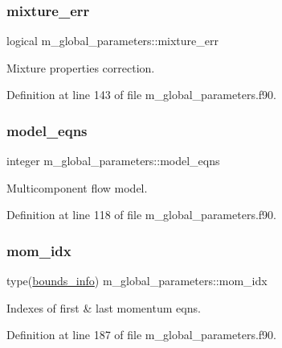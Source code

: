 \subsubsection{\texorpdfstring{mixture\+\_\+err}{mixture\_err}}
{\footnotesize\ttfamily logical m\+\_\+global\+\_\+parameters\+::mixture\+\_\+err}



Mixture properties correction. 



Definition at line 143 of file m\+\_\+global\+\_\+parameters.\+f90.

\mbox{\label{namespacem__global__parameters_a6cf2e92cfc3b519fb6da6fe9e88fab31}} 
\subsubsection{\texorpdfstring{model\+\_\+eqns}{model\_eqns}}
{\footnotesize\ttfamily integer m\+\_\+global\+\_\+parameters\+::model\+\_\+eqns}



Multicomponent flow model. 



Definition at line 118 of file m\+\_\+global\+\_\+parameters.\+f90.

\mbox{\label{namespacem__global__parameters_ad138d35528cf27ff42dba00d13c269be}} 
\subsubsection{\texorpdfstring{mom\+\_\+idx}{mom\_idx}}
{\footnotesize\ttfamily type(\hyperlink{structm__derived__types_1_1bounds__info}{bounds\+\_\+info}) m\+\_\+global\+\_\+parameters\+::mom\+\_\+idx}



Indexes of first \& last momentum eqns. 



Definition at line 187 of file m\+\_\+global\+\_\+parameters.\+f90.

